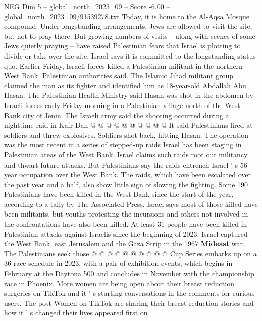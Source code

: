\begin{textsample}{NEG Dim 5 – global\_north\_2023\_09 – Score -6.00 – global\_north\_2023\_09/91539278.txt}
Today, it is home to the Al-Aqsa Mosque compound.
Under longstanding arrangements, Jews are allowed to visit the site, but not to pray there.
But growing numbers of visits -- along with scenes of some Jews quietly praying -- have raised Palestinian fears that Israel is plotting to divide or take over the site.
Israel says it is committed to the longstanding status quo.
Earlier Friday, Israeli forces killed a Palestinian militant in the northern West Bank, Palestinian authorities said.
The Islamic Jihad militant group claimed the man as its fighter and identified him as 18-year-old Abdallah Abu Hasan.
The Palestinian Health Ministry said Hasan was shot in the abdomen by Israeli forces early Friday morning in a Palestinian village north of the West Bank city of Jenin.
The Israeli army said the shooting occurred during a nighttime raid in Kafr Dan @ @ @ @ @ @ @ @ @ @ It said Palestinians fired at soldiers and threw explosives.
Soldiers shot back, hitting Hasan.
The operation was the most recent in a series of stepped-up raids Israel has been staging in Palestinian areas of the West Bank.
Israel claims such raids root out militancy and thwart future attacks.
But Palestinians say the raids entrench Israel ' s 56-year occupation over the West Bank.
The raids, which have been escalated over the past year and a half, also show little sign of slowing the fighting.
Some 190 Palestinians have been killed in the West Bank since the start of the year, according to a tally by The Associated Press.
Israel says most of those killed have been militants, but youths protesting the incursions and others not involved in the confrontations have also been killed.
At least 31 people have been killed in Palestinian attacks against Israelis since the beginning of 2023.
Israel captured the West Bank, east Jerusalem and the Gaza Strip in the 1967 \textbf{Mideast} war.
The Palestinians seek those @ @ @ @ @ @ @ @ @ @ Cup Series embarks up on a 36-race schedule in 2023, with a pair of exhibition events, which begins in February at the Daytona 500 and concludes in November with the championship race in Phoenix.
More women are being open about their breast reduction surgeries on TikTok and it ' s starting conversations in the comments for curious users.
The post Women on TikTok are sharing their breast reduction stories and how it ' s changed their lives appeared first on

\end{textsample}
